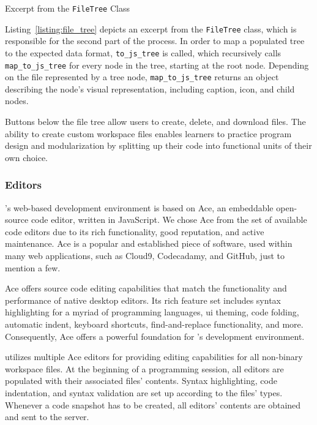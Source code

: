 \begin{listing}
\inputminted[frame=lines]{rb}{listings/file_tree.rb}
\vspace{-0.33cm}
\caption{Excerpt from the \texttt{FileTree} Class}
\label{listing:file_tree}
\end{listing}

Listing~\ref{listing:file_tree} depicts an excerpt from the \texttt{FileTree} class, which is responsible for the second part of the process. In order to map a populated tree to the expected data format, \texttt{to_js_tree} is called, which recursively calls \texttt{map_to_js_tree} for every node in the tree, starting at the root node. Depending on the file represented by a tree node, \texttt{map_to_js_tree} returns an object describing the node's visual representation, including caption, icon, and child nodes.

Buttons below the file tree allow users to create, delete, and download files. The ability to create custom workspace files enables learners to practice program design and modularization by splitting up their code into functional units of their own choice.

\subsubsection{Editors}

\tool's web-based development environment is based on Ace, an embeddable open-source code editor, written in JavaScript. We chose Ace from the set of available code editors due to its rich functionality, good reputation, and active maintenance. Ace is a popular and established piece of software, used within many web applications, such as Cloud9, Codecadamy, and GitHub, just to mention a few.

Ace offers source code editing capabilities that match the functionality and performance of native desktop editors. Its rich feature set includes syntax highlighting for a myriad of programming languages, \gls{ui} theming, code folding, automatic indent, keyboard shortcuts, find-and-replace functionality, and more. Consequently, Ace offers a powerful foundation for \tool's development environment.

\tool utilizes multiple Ace editors for providing editing capabilities for all non-binary workspace files. At the beginning of a programming session, all editors are populated with their associated files' contents. Syntax highlighting, code indentation, and syntax validation are set up according to the files' types. Whenever a code snapshot has to be created, all editors' contents are obtained and sent to the server.

